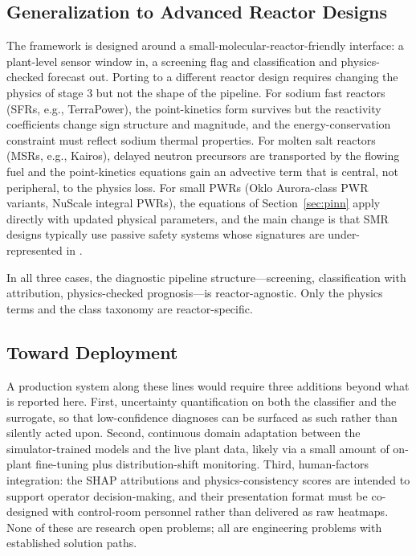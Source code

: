 \subsection{Generalization to Advanced Reactor Designs}

The framework is designed around a small-molecular-reactor-friendly interface: a plant-level sensor window in, a screening flag and classification and physics-checked forecast out. Porting to a different reactor design requires changing the physics of stage 3 but not the shape of the pipeline. For sodium fast reactors (SFRs, e.g., TerraPower), the point-kinetics form survives but the reactivity coefficients change sign structure and magnitude, and the energy-conservation constraint must reflect sodium thermal properties. For molten salt reactors (MSRs, e.g., Kairos), delayed neutron precursors are transported by the flowing fuel and the point-kinetics equations gain an advective term that is central, not peripheral, to the physics loss. For small PWRs (Oklo Aurora-class PWR variants, NuScale integral PWRs), the equations of Section~\ref{sec:pinn} apply directly with updated physical parameters, and the main change is that SMR designs typically use passive safety systems whose signatures are under-represented in \nppad{}.

In all three cases, the diagnostic pipeline structure---screening, classification with attribution, physics-checked prognosis---is reactor-agnostic. Only the physics terms and the class taxonomy are reactor-specific.

\subsection{Toward Deployment}

A production system along these lines would require three additions beyond what is reported here. First, uncertainty quantification on both the classifier and the surrogate, so that low-confidence diagnoses can be surfaced as such rather than silently acted upon. Second, continuous domain adaptation between the simulator-trained models and the live plant data, likely via a small amount of on-plant fine-tuning plus distribution-shift monitoring. Third, human-factors integration: the SHAP attributions and physics-consistency scores are intended to support operator decision-making, and their presentation format must be co-designed with control-room personnel rather than delivered as raw heatmaps. None of these are research open problems; all are engineering problems with established solution paths.
